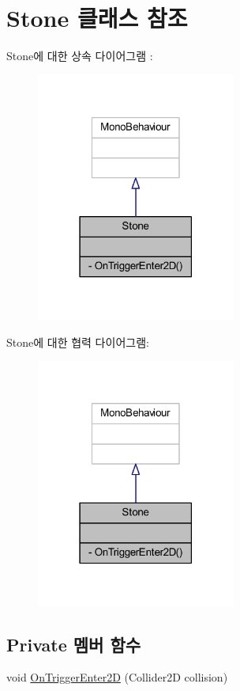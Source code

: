 \hypertarget{class_stone}{}\section{Stone 클래스 참조}
\label{class_stone}


Stone에 대한 상속 다이어그램 \+: \nopagebreak
\begin{figure}[H]
\begin{center}
\leavevmode
\includegraphics[width=186pt]{d2/d40/class_stone__inherit__graph}
\end{center}
\end{figure}


Stone에 대한 협력 다이어그램\+:\nopagebreak
\begin{figure}[H]
\begin{center}
\leavevmode
\includegraphics[width=186pt]{d6/d51/class_stone__coll__graph}
\end{center}
\end{figure}
\subsection*{Private 멤버 함수}
\begin{DoxyCompactItemize}
\item 
void \mbox{\hyperlink{class_stone_a3aa6fa2eaa978c07b9d8c2d6e16b3f7a}{On\+Trigger\+Enter2D}} (Collider2D collision)
\end{DoxyCompactItemize}


